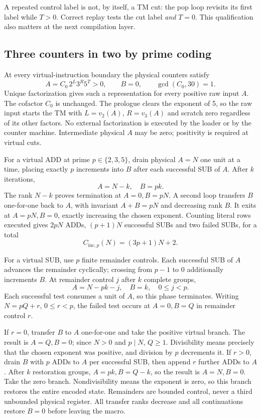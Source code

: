 \documentclass[11pt,a4paper]{article}
\numberwithin{equation}{section}
\begin{document}
A repeated control label is not, by itself, a TM cut: the pop loop revisits
its first label while $T>0$. Correct replay tests the cut label \emph{and}
$T=0$. This qualification also matters at the next compilation layer.

\subsection{Three counters in two by prime coding}\label{fpa:bc:sec:prime}
At every virtual-instruction boundary the physical counters satisfy
\begin{equation}
 A=C_0\,2^L3^R5^T>0,\qquad B=0,\qquad\gcd(C_0,30)=1.
 \label{fpa:bc:eq:prime}
\end{equation}
Unique factorization gives such a representation for every positive raw
input $A$. The cofactor $C_0$ is unchanged. The prologue clears the exponent
of 5, so the raw input starts the TM with
$L=v_2(A)$, $R=v_3(A)$ and scratch zero regardless of its other factors.
No external factorization is executed by the loader or by the counter machine.
Intermediate physical $A$ may be zero; positivity is required at virtual cuts.

For a virtual ADD at prime $p\in\{2,3,5\}$, drain physical $A=N$ one unit
at a time, placing exactly $p$ increments into $B$ after each successful
SUB of $A$. After $k$ iterations,
\[
 A=N-k,\quad B=pk.
\]
The rank $N-k$ proves termination at $A=0,B=pN$. A second loop transfers $B$
one-for-one back to $A$, with invariant $A+B=pN$ and decreasing rank $B$.
It exits at $A=pN,B=0$, exactly increasing the chosen exponent. Counting
literal rows executed gives $2pN$ ADDs, $(p+1)N$ successful SUBs and two
failed SUBs, for a total
\begin{equation}
 C_{\mathrm{inc},p}(N)=(3p+1)N+2.\label{fpa:bc:eq:primeinc}
\end{equation}

For a virtual SUB, use $p$ finite remainder controls. Each successful SUB of
$A$ advances the remainder cyclically; crossing from $p-1$ to 0 additionally
increments $B$. At remainder control $j$ after $k$ complete groups,
\[
 A=N-pk-j,\quad B=k,\quad0\le j<p.
\]
Each successful test consumes a unit of $A$, so this phase terminates.
Writing $N=pQ+r$, $0\le r<p$, the failed test occurs at $A=0,B=Q$ in
remainder control $r$.

If $r=0$, transfer $B$ to $A$ one-for-one and take the positive virtual branch.
The result is $A=Q,B=0$; since $N>0$ and $p\mid N$, $Q\ge1$.
Divisibility means precisely that the chosen exponent was positive, and
division by $p$ decrements it. If $r>0$, drain $B$ with $p$ ADDs to $A$ per
successful SUB, then append $r$ further ADDs to $A$. After $k$ restoration
groups, $A=pk,B=Q-k$, so the result is $A=N,B=0$. Take the zero branch.
Nondivisibility means the exponent is zero, so this branch restores the
entire encoded state. Remainders are bounded control, never a third unbounded
physical register. All transfer ranks decrease and all continuations restore
$B=0$ before leaving the macro.
\end{document}
